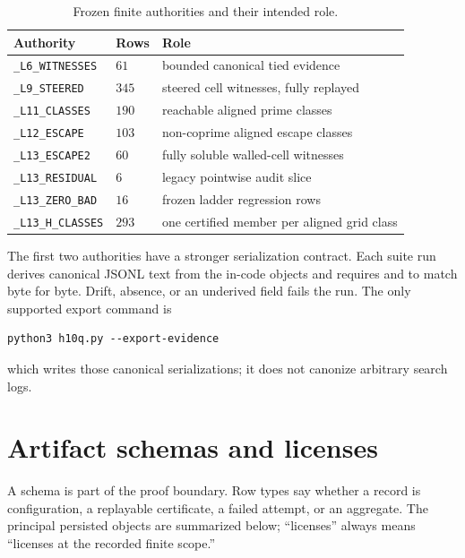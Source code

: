 \documentclass[11pt]{amsart}%
\begin{document}
\begin{table}[t]
\centering
\small
\caption{Frozen finite authorities and their intended role.}
\begin{tabular}{@{}lll@{}}
\toprule
Authority & Rows & Role \\
\midrule
\texttt{\_L6\_WITNESSES} & \(61\) & bounded canonical tied evidence \\ %
\texttt{\_L9\_STEERED} & \(345\) & steered cell witnesses, fully replayed \\ %
\texttt{\_L11\_CLASSES} & \(190\) & reachable aligned prime classes \\ %
\texttt{\_L12\_ESCAPE} & \(103\) & non-coprime aligned escape classes \\ %
\texttt{\_L13\_ESCAPE2} & \(60\) & fully soluble walled-cell witnesses \\ %
\texttt{\_L13\_RESIDUAL} & \(6\) & legacy pointwise audit slice \\ %
\texttt{\_L13\_ZERO\_BAD} & \(16\) & frozen ladder regression rows \\ %
\texttt{\_L13\_H\_CLASSES} & \(293\) & one certified member per aligned grid class \\ %
\bottomrule
\end{tabular}
\end{table}

The first two authorities have a stronger serialization contract.  Each suite
run derives canonical JSONL text from the in-code objects and requires
 and
 to match byte for byte.  Drift, absence, or an
underived field fails the run.  The only supported export command is
\begin{verbatim}
python3 h10q.py --export-evidence
\end{verbatim}
which writes those canonical serializations; it does not canonize arbitrary
search logs.

\section{Artifact schemas and licenses}

A schema is part of the proof boundary.  Row types say whether a record is
configuration, a replayable certificate, a failed attempt, or an aggregate.
The principal persisted objects are summarized below; ``licenses'' always
means ``licenses at the recorded finite scope.''
\end{document}
